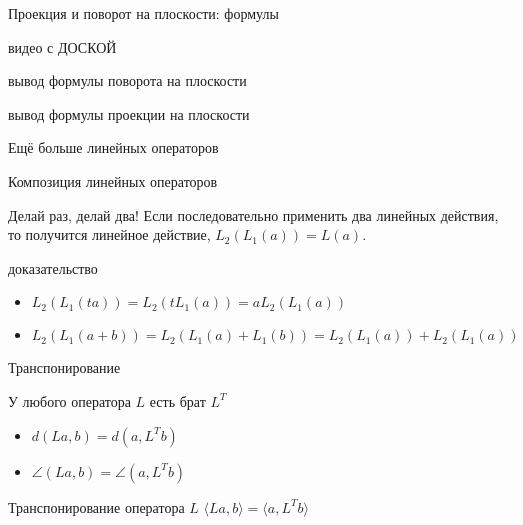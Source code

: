 \documentclass[14pt,xcolor=dvipsnames]{beamer}
\begin{document}
\begin{frame} %
  Проекция и поворот на плоскости: формулы
\end{frame}

  
\begin{frame}{видео с ДОСКОЙ}

\begin{block}{вывод формулы поворота на плоскости}
\end{block}

\begin{block}{вывод формулы проекции на плоскости}
\end{block}


\end{frame}
  
\begin{frame} %
  Ещё больше линейных операторов
\end{frame}

\begin{frame}{Композиция линейных операторов}

\begin{block}{Делай раз, делай два!}
Если последовательно применить два линейных действия, то получится линейное действие, $L_2 (L_1 (a)) = L(a)$.
\end{block}

\begin{block}{доказательство}
  \begin{itemize}
    \item $L_2 (L_1 (t a)) = L_2 (t L_1 (a)) = a L_2(L_1(a))$
    \item $L_2 (L_1 (a + b)) = L_2 (L_1 (a) + L_1(b)) = L_2(L_1(a)) + L_2(L_1(a))$
  \end{itemize}
\end{block}

\end{frame}


\begin{frame}{Транспонирование}

\begin{block}{У любого оператора $L$ есть брат $L^T$}
\begin{itemize}
  \item $d(La, b)=d(a, L^Tb)$
  \item $\angle(La, b) = \angle(a, L^Tb)$
\end{itemize}
\end{block}

\begin{block}{Транспонирование оператора $L$}
  $\langle La, b\rangle = \langle a, L^T b\rangle$
\end{block}

\end{frame}
\end{document}
